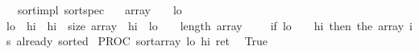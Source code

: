 \begin{isabellebody}
\ {\isacharparenleft}\ sort{\isacharunderscore}impl{\isacharparenright}\ sort{\isacharunderscore}spec{\isacharcolon}\isanewline
{\isachardoublequoteopen}{\isasymforall}{\isasymsigma}{\isachardot}\ {\isasymGamma}{\isasymturnstile}\ {\isasymlbrace}{\isasymsigma}{\isachardot}\ {\isacharparenleft}{\isasymacute}array\ {\isasymnoteq}\ {\isacharbrackleft}{\isacharbrackright}{\isacharparenright}\ {\isasymand}\ {\isacharparenleft}{\isasymacute}lo\ {\isasymge}\ {}{\isacharparenright}\ {\isasymand}\isanewline
{\isacharparenleft}{\isasymacute}lo\ {\isacharplus}{}{\isasymle}\ {\isasymacute}hi{\isacharparenright}\ {\isasymand}\ {\isacharparenleft}{\isasymacute}hi\ {\isasymle}\ size\ {\isasymacute}array{\isacharparenright}\ {\isasymand}\ {\isacharparenleft}{\isasymacute}hi\ {\isacharminus}\ {\isasymacute}lo\ {\isasymge}\ {}{}{\isacharparenright}\ {\isasymand}\ {\isacharparenleft}length\ {\isasymacute}array\ {\isacharless}\ {}{}{}{}{}{}{}{}{}{}{\isacharparenright}\ {\isasymrbrace}\ {\isacharparenleft}{\isacharasterisk}\ if\ lo\ {\isacharplus}\ {}\ {\isacharequal}\ hi\ then\ the\ array\ is\ already\ sorted\ {\isacharasterisk}{\isacharparenright}\isanewline
PROC\ sort{\isacharparenleft}{\isasymacute}array{\isacharcomma}\ {\isasymacute}lo{\isacharcomma}\ {\isasymacute}hi{\isacharcomma}\ {\isasymacute}ret{\isacharparenright}\ \isanewline
{\isasymlbrace}\ True{\isasymrbrace}{\isachardoublequoteclose}\isanewline
%
\isadelimproof
\ \ %
\endisadelimproof
%
\isatagproof
{}\isamarkupfalse%
%
\endisatagproof
{\isafoldproof}%
%
\isadelimproof
\isanewline
%
\endisadelimproof
\isanewline
\isanewline
%
\isadelimtheory
\isanewline
%
\endisadelimtheory
%
\isatagtheory
{}\isamarkupfalse%
%
\endisatagtheory
{\isafoldtheory}%
%
\isadelimtheory
%
\endisadelimtheory
%
\end{isabellebody}%

